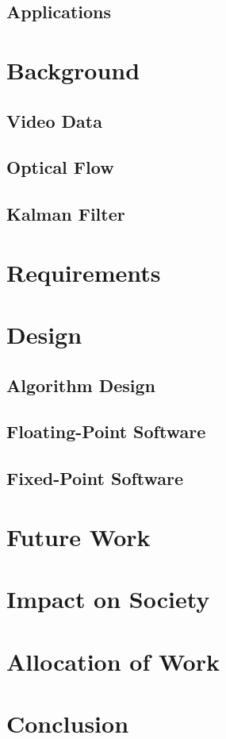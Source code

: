 \documentclass[12pt]{article} %
\begin{document}
\subsection{Applications}
\section{Background}
\subsection{Video Data}
\subsection{Optical Flow}
\subsection{Kalman Filter}
\section{Requirements}
\section{Design}
\subsection{Algorithm Design}
\subsection{Floating-Point Software}
\subsection{Fixed-Point Software}
\section{Future Work}
\section{Impact on Society}
\section{Allocation of Work}
\section{Conclusion}
\end{document}
